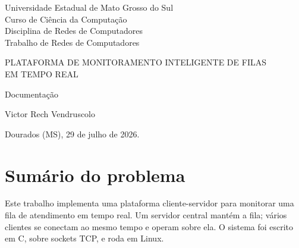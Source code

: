 \documentclass[12pt,a4paper]{article}
\begin{document}
\begin{titlepage}
\thispagestyle{empty}
\begin{center}

{\large Universidade Estadual de Mato Grosso do Sul}\\[10pt]
{\large Curso de Ciência da Computação}\\[10pt]
{\large Disciplina de Redes de Computadores}\\[10pt]
{\large Trabalho de Redes de Computadores}

\vspace{7cm}

{\large PLATAFORMA DE MONITORAMENTO INTELIGENTE DE FILAS\\[4pt] EM TEMPO REAL}

\vspace{2cm}

{\large Documentação}

\vspace{1.5cm}

{\large Victor Rech Vendruscolo}

\vfill

{\large Dourados (MS), 29 de julho de 2026.}

\end{center}
\end{titlepage}

\thispagestyle{empty}
\tableofcontents
\newpage

\setcounter{page}{1}

\section{Sumário do problema}

Este trabalho implementa uma plataforma cliente-servidor para monitorar uma fila
de atendimento em tempo real. Um servidor central mantém a fila; vários clientes
se conectam ao mesmo tempo e operam sobre ela. O sistema foi escrito em C, sobre
sockets TCP, e roda em Linux.
\end{document}
